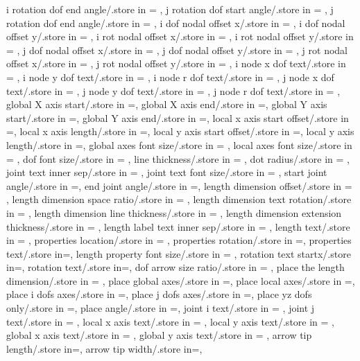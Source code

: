 {  i rotation dof end angle/.store in = \irotdofendangle,
  j rotation dof start angle/.store in = \jrotdofstartangle,
  j rotation dof end angle/.store in = \jrotdofendangle, 
  i dof nodal offset x/.store in = \idofnodaloffsetx,
  i dof nodal offset y/.store in = \idofnodaloffsety,
  i rot nodal offset x/.store in = \irotnodaloffsetx,
  i rot nodal offset y/.store in = \irotnodaloffsety,
  j dof nodal offset x/.store in = \jdofnodaloffsetx,
  j dof nodal offset y/.store in = \jdofnodaloffsety,
  j rot nodal offset x/.store in = \jrotnodaloffsetx,
  j rot nodal offset y/.store in = \jrotnodaloffsety,
  i node x dof text/.store in = \inodexdoftext,
  i node y dof text/.store in = \inodeydoftext,
  i node r dof text/.store in = \inoderdoftext,
  j node x dof text/.store in = \jnodexdoftext,
  j node y dof text/.store in = \jnodeydoftext,
  j node r dof text/.store in = \jnoderdoftext,
  global X axis start/.store in =\globalXstart,
  global X axis end/.store in =\globalXend,
  global Y axis start/.store in =\globalYstart,
  global Y axis end/.store in =\globalYend,
  local x axis start offset/.store in =\localxstartoffset,
  local x axis length/.store in =\localxlength,
  local y axis start offset/.store in =\localystartoffset,
  local y axis length/.store in =\localylength,
  global axes font size/.store in = \globalaxesfontsize,
  local axes font size/.store in = \localaxesfontsize,
  dof font size/.store in = \doffontsize,
  line thickness/.store in = \linethickness,
  dot radius/.store in = \dotradius,
  joint text inner sep/.store in = \jointinnersep,
  joint text font size/.store in = \jointtextfontsize,
  start joint angle/.store in =\startjointangle,
  end joint angle/.store in =\endjointangle,
  length dimension offset/.store in = \lengthdimoffset,
  length dimension space ratio/.store in = \lengthdimspaceratio,
  length dimension text rotation/.store in = \lengthlabelrotation,
  length dimension line thickness/.store in = \lengthdimlinethick,
  length dimension extension thickness/.store in = \lengthdimextthick,
  length label text inner sep/.store in = \lengthlabeltextinnersep,
  length text/.store in = \lengthtext,
  properties location/.store in = \propertyloc,
  properties rotation/.store in =\propertyrotation,
  properties text/.store in=\propertiestext,
  length property font size/.store in = \lengthpropfontsize,
  rotation text startx/.store in=\rotationanglex,
  rotation text/.store in=\rotationtext,
  dof arrow size ratio/.store in = \dofarrowsiz,
  place the length dimension/.store in = \placelengthdim,
  place global axes/.store in =\placeglobalaxes,
  place local axes/.store in =\placelocalaxes,
  place i dofs axes/.store in =\placeidofs,
  place j dofs axes/.store in =\placejdofs,
  place yz dofs only/.store in =\placeyzdofsonly,
  place angle/.store in =\placeangle,
  joint i text/.store in = \jointitext,
  joint j text/.store in = \jointjtext,
  local x axis text/.store in = \localxtext,
  local y axis text/.store in = \localytext,
  global x axis text/.store in = \globalxtext,
  global y axis text/.store in = \globalytext,
  arrow tip length/.store in=\arrlen,
  arrow tip width/.store in=\arrwid,}

